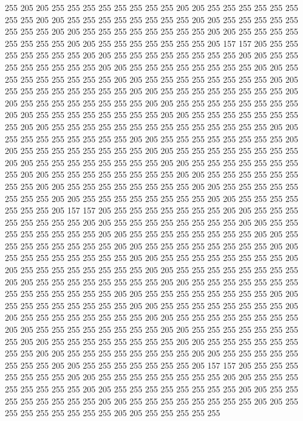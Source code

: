 255 205 205 255 255 255 255 255 255 255 255 205 205 255 255 255 255 255 255 255
255 205 205 255 255 255 255 255 255 255 255 205 205 255 255 255 255 255 255 255
255 205 205 255 255 255 255 255 255 255 255 205 205 255 255 255 255 255 255 255
255 205 205 255 255 255 255 255 255 255 205 157 157 205 255 255 255 255 255 255
255 205 205 255 255 255 255 255 255 255 255 205 205 255 255 255 255 255 255 255
255 205 205 255 255 255 255 255 255 255 255 205 205 255 255 255 255 255 255 255
255 205 205 255 255 255 255 255 255 255 255 205 205 255 255 255 255 255 255 255
255 205 205 255 255 255 255 255 255 255 255 205 205 255 255 255 255 255 255 255
255 205 205 255 255 255 255 255 255 255 255 205 205 255 255 255 255 255 255 255
255 205 205 255 255 255 255 255 255 255 255 205 205 255 255 255 255 255 255 255
255 255 255 255 255 255 255 205 205 255 255 255 255 255 255 255 255 205 205 255
255 255 255 255 255 255 255 205 205 255 255 255 255 255 255 255 255 205 205 255
255 255 255 255 255 255 255 205 205 255 255 255 255 255 255 255 255 205 205 255
255 255 255 255 255 255 255 205 205 255 255 255 255 255 255 255 255 205 205 255
255 255 255 255 255 255 255 205 205 255 255 255 255 255 255 255 255 205 205 255
255 255 255 255 255 255 255 205 205 255 255 255 255 255 255 255 255 205 205 255
255 255 255 255 255 255 205 157 157 205 255 255 255 255 255 255 255 205 205 255
255 255 255 255 255 255 255 205 205 255 255 255 255 255 255 255 255 205 205 255
255 255 255 255 255 255 255 205 205 255 255 255 255 255 255 255 255 205 205 255
255 255 255 255 255 255 255 205 205 255 255 255 255 255 255 255 255 205 205 255
255 255 255 255 255 255 255 205 205 255 255 255 255 255 255 255 255 205 205 255
255 255 255 255 255 255 255 205 205 255 255 255 255 255 255 255 255 205 205 255
255 255 255 255 255 255 255 205 205 255 255 255 255 255 255 255 255 255 255 255
255 255 255 205 205 255 255 255 255 255 255 255 255 205 205 255 255 255 255 255
255 255 255 205 205 255 255 255 255 255 255 255 255 205 205 255 255 255 255 255
255 255 255 205 205 255 255 255 255 255 255 255 255 205 205 255 255 255 255 255
255 255 255 205 205 255 255 255 255 255 255 255 255 205 205 255 255 255 255 255
255 255 255 205 205 255 255 255 255 255 255 255 255 205 205 255 255 255 255 255
255 255 255 205 205 255 255 255 255 255 255 255 255 205 205 255 255 255 255 255
255 255 205 157 157 205 255 255 255 255 255 255 255 205 205 255 255 255 255 255
255 255 255 205 205 255 255 255 255 255 255 255 255 205 205 255 255 255 255 255
255 255 255 205 205 255 255 255 255 255 255 255 255 205 205 255 255 255 255 255
255 255 255 205 205 255 255 255 255 255 255 255 255 205 205 255 255 255 255 255

